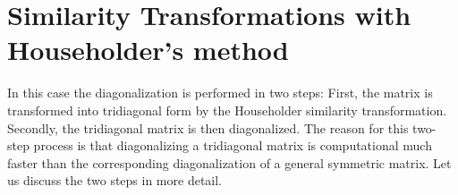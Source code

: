 
\section{Similarity Transformations with  Householder's method}
%
In this case the diagonalization is performed in two steps:
First, the matrix is transformed into tridiagonal form by the
Householder similarity transformation. Secondly, the tridiagonal
matrix is then diagonalized. The reason for this two-step process is that
diagonalizing a tridiagonal matrix is computational much faster than
the corresponding diagonalization of a general symmetric matrix. Let
us discuss the two steps in more detail.

%
